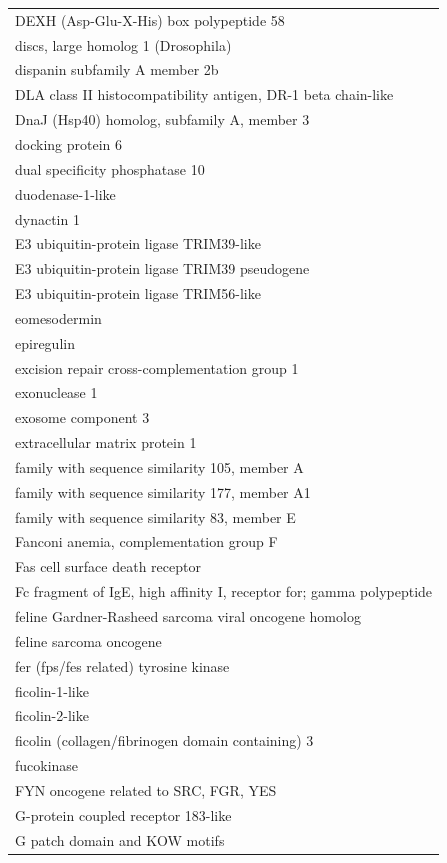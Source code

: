\documentclass[english]{article}\usepackage[]{graphicx}\usepackage[]{color}
\begin{document}
\begin{longtable}{l}
DEXH (Asp-Glu-X-His) box polypeptide 58 \\ 
discs, large homolog 1 (Drosophila) \\ 
dispanin subfamily A member 2b \\ 
DLA class II histocompatibility antigen, DR-1 beta chain-like \\ 
DnaJ (Hsp40) homolog, subfamily A, member 3 \\ 
docking protein 6 \\ 
dual specificity phosphatase 10 \\ 
duodenase-1-like \\ 
dynactin 1 \\ 
E3 ubiquitin-protein ligase TRIM39-like \\ 
E3 ubiquitin-protein ligase TRIM39 pseudogene \\ 
E3 ubiquitin-protein ligase TRIM56-like \\ 
eomesodermin \\ 
epiregulin \\ 
excision repair cross-complementation group 1 \\ 
exonuclease 1 \\ 
exosome component 3 \\ 
extracellular matrix protein 1 \\ 
family with sequence similarity 105, member A \\ 
family with sequence similarity 177, member A1 \\ 
family with sequence similarity 83, member E \\ 
Fanconi anemia, complementation group F \\ 
Fas cell surface death receptor \\ 
Fc fragment of IgE, high affinity I, receptor for; gamma polypeptide \\ 
feline Gardner-Rasheed sarcoma viral oncogene homolog \\ 
feline sarcoma oncogene \\ 
fer (fps/fes related) tyrosine kinase \\ 
ficolin-1-like \\ 
ficolin-2-like \\ 
ficolin (collagen/fibrinogen domain containing) 3 \\ 
fucokinase \\ 
FYN oncogene related to SRC, FGR, YES \\ 
G-protein coupled receptor 183-like \\ 
G patch domain and KOW motifs \\ 

\end{longtable}
\end{document}
